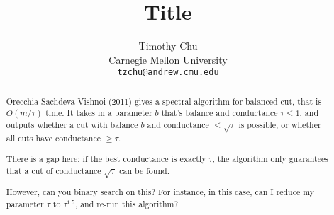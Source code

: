 


\title{Title}
\author{
  Timothy Chu \\
  Carnegie Mellon University\\
  \texttt{tzchu@andrew.cmu.edu}
}

\setcounter{page}{0}
\maketitle
\thispagestyle{empty}
\begin{abstract}
Orecchia Sachdeva Vishnoi (2011) gives a spectral algorithm for
balanced cut, that is $O(m / \tau)$ time. It takes in a parameter
$b$ that's balance and conductance $\tau \leq 1$, and outputs whether
a cut with balance $b$ and conductance $\leq \sqrt{\tau}$ is possible,
  or whether all cuts have conductance $ \geq \tau$.

  There is a gap here: if the best conductance is exactly $\tau$,
  the algorithm only guarantees that a cut of conductance
  $\sqrt{\tau}$ can be found. 
  
  However, can you binary search on
  this? For instance, in this case, can I reduce my parameter
  $\tau$ to $\tau^{1.5}$, and re-run this algorithm?
\end{abstract}

\clearpage


\begin{appendix}
\end{appendix}

